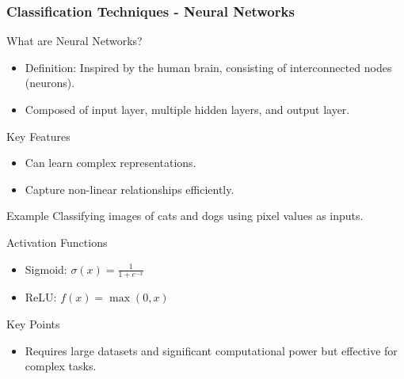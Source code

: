 \documentclass[aspectratio=169]{beamer}
\begin{document}
\begin{frame}[fragile]
    \frametitle{Classification Techniques - Neural Networks}
    \begin{block}{What are Neural Networks?}
        \begin{itemize}
            \item Definition: Inspired by the human brain, consisting of interconnected nodes (neurons).
            \item Composed of input layer, multiple hidden layers, and output layer.
        \end{itemize}
    \end{block}

    \begin{block}{Key Features}
        \begin{itemize}
            \item Can learn complex representations.
            \item Capture non-linear relationships efficiently.
        \end{itemize}
    \end{block}

    \begin{block}{Example}
        Classifying images of cats and dogs using pixel values as inputs.
    \end{block}

    \begin{block}{Activation Functions}
        \begin{itemize}
            \item Sigmoid: \( \sigma(x) = \frac{1}{1 + e^{-x}} \)
            \item ReLU: \( f(x) = \max(0, x) \)
        \end{itemize}
    \end{block}

    \begin{block}{Key Points}
        \begin{itemize}
            \item Requires large datasets and significant computational power but effective for complex tasks.
        \end{itemize}
    \end{block}
\end{frame}
\end{document}

